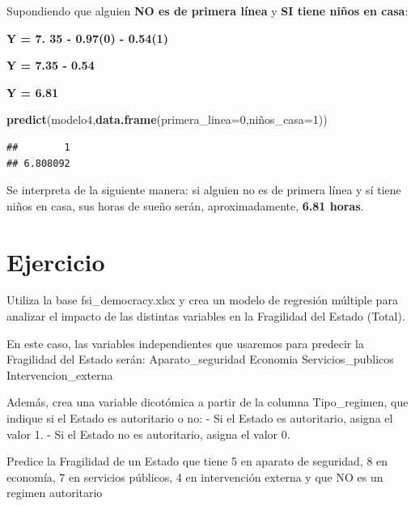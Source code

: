 \documentclass[
]{article}
\newenvironment{Shaded}{\begin{snugshade}}{\end{snugshade}}
\newcommand{\AttributeTok}[1]{\textcolor[rgb]{0.13,0.29,0.53}{#1}}
\newcommand{\DecValTok}[1]{\textcolor[rgb]{0.00,0.00,0.81}{#1}}
\newcommand{\FunctionTok}[1]{\textcolor[rgb]{0.13,0.29,0.53}{\textbf{#1}}}
\newcommand{\NormalTok}[1]{#1}
\begin{document}
Supondiendo que alguien \textbf{NO es de primera línea} y \textbf{SI
tiene niños en casa}:

\textbf{Y = 7. 35 - 0.97(0) - 0.54(1)}

\textbf{Y = 7.35 - 0.54}

\textbf{Y = 6.81}

\begin{Shaded}
\begin{Highlighting}[]
\FunctionTok{predict}\NormalTok{(modelo4,}\FunctionTok{data.frame}\NormalTok{(}\AttributeTok{primera\_linea=}\DecValTok{0}\NormalTok{,niños}\AttributeTok{\_casa=}\DecValTok{1}\NormalTok{))}
\end{Highlighting}
\end{Shaded}

\begin{verbatim}
##        1 
## 6.808092
\end{verbatim}

Se interpreta de la siguiente manera: si alguien no es de primera línea
y sí tiene niños en casa, sus horas de sueño serán, aproximadamente,
\textbf{6.81 horas}.

\section{Ejercicio}\label{ejercicio}

Utiliza la base fsi\_democracy.xlsx y crea un modelo de regresión
múltiple para analizar el impacto de las distintas variables en la
Fragilidad del Estado (Total).

En este caso, las variables independientes que usaremos para predecir la
Fragilidad del Estado serán: Aparato\_seguridad Economia
Servicios\_publicos Intervencion\_externa

Además, crea una variable dicotómica a partir de la columna
Tipo\_regimen, que indique si el Estado es autoritario o no: - Si el
Estado es autoritario, asigna el valor 1. - Si el Estado no es
autoritario, asigna el valor 0.

Predice la Fragilidad de un Estado que tiene 5 en aparato de seguridad,
8 en economía, 7 en servicios públicos, 4 en intervención externa y que
NO es un regimen autoritario
\end{document}
